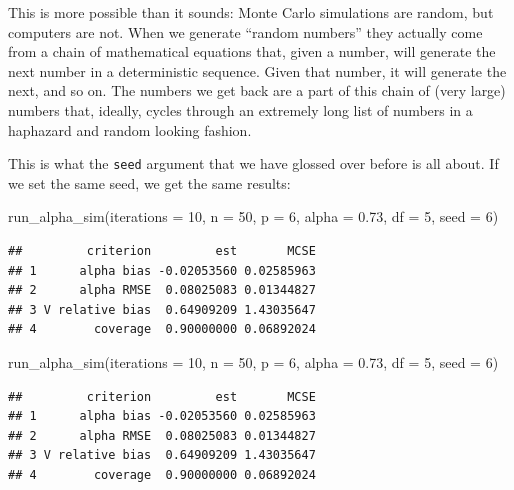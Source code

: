\documentclass[
]{book}
\newenvironment{Shaded}{\begin{snugshade}}{\end{snugshade}}
\newcommand{\AttributeTok}[1]{\textcolor[rgb]{0.77,0.63,0.00}{#1}}
\newcommand{\DecValTok}[1]{\textcolor[rgb]{0.00,0.00,0.81}{#1}}
\newcommand{\FloatTok}[1]{\textcolor[rgb]{0.00,0.00,0.81}{#1}}
\newcommand{\FunctionTok}[1]{\textcolor[rgb]{0.00,0.00,0.00}{#1}}
\newcommand{\NormalTok}[1]{#1}
\begin{document}
This is more possible than it sounds: Monte Carlo simulations are random, but computers are not.
When we generate ``random numbers'' they actually come from a chain of mathematical equations that, given a number, will generate the next number in a deterministic sequence.
Given that number, it will generate the next, and so on.
The numbers we get back are a part of this chain of (very large) numbers that, ideally, cycles through an extremely long list of numbers in a haphazard and random looking fashion.

This is what the \texttt{seed} argument that we have glossed over before is all about.
If we set the same seed, we get the same results:

\begin{Shaded}
\begin{Highlighting}[]
\FunctionTok{run\_alpha\_sim}\NormalTok{(}\AttributeTok{iterations =} \DecValTok{10}\NormalTok{, }\AttributeTok{n =} \DecValTok{50}\NormalTok{, }\AttributeTok{p =} \DecValTok{6}\NormalTok{, }\AttributeTok{alpha =} \FloatTok{0.73}\NormalTok{, }\AttributeTok{df =} \DecValTok{5}\NormalTok{,}
              \AttributeTok{seed =} \DecValTok{6}\NormalTok{)}
\end{Highlighting}
\end{Shaded}

\begin{verbatim}
##         criterion         est       MCSE
## 1      alpha bias -0.02053560 0.02585963
## 2      alpha RMSE  0.08025083 0.01344827
## 3 V relative bias  0.64909209 1.43035647
## 4        coverage  0.90000000 0.06892024
\end{verbatim}

\begin{Shaded}
\begin{Highlighting}[]
\FunctionTok{run\_alpha\_sim}\NormalTok{(}\AttributeTok{iterations =} \DecValTok{10}\NormalTok{, }\AttributeTok{n =} \DecValTok{50}\NormalTok{, }\AttributeTok{p =} \DecValTok{6}\NormalTok{, }\AttributeTok{alpha =} \FloatTok{0.73}\NormalTok{, }\AttributeTok{df =} \DecValTok{5}\NormalTok{, }
              \AttributeTok{seed =} \DecValTok{6}\NormalTok{)}
\end{Highlighting}
\end{Shaded}

\begin{verbatim}
##         criterion         est       MCSE
## 1      alpha bias -0.02053560 0.02585963
## 2      alpha RMSE  0.08025083 0.01344827
## 3 V relative bias  0.64909209 1.43035647
## 4        coverage  0.90000000 0.06892024
\end{verbatim}
\end{document}
